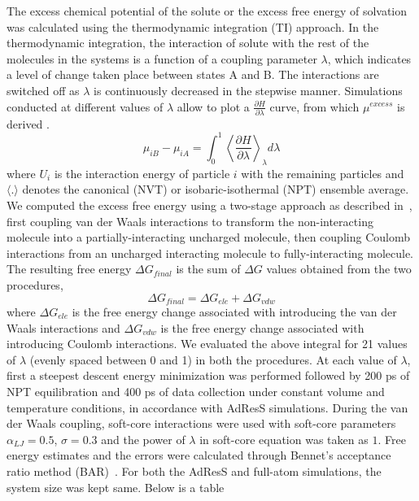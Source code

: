 \documentclass[a4paper,preprint,unsortedaddress]{revtex4-1}
\begin{document}
The excess chemical potential of the solute or the excess free energy of solvation was calculated using the 
thermodynamic integration (TI) approach. In the thermodynamic integration, the 
interaction of solute with the rest of the molecules in the systems is a function 
of a coupling parameter $\lambda$, which indicates a level of change taken place between states
A and B. The interactions are switched off as $\lambda$ is 
continuously decreased in the stepwise manner. Simulations conducted at different values of 
$\lambda$ allow to plot a $\frac{\partial H}{\partial \lambda}$ curve, from which 
$\mu^{excess}$ is derived \cite{mu}. 
\begin{equation}
 \mu_{iB} - \mu_{iA} = \int_{0}^{1} \left \langle \frac{\partial H}{\partial \lambda} \right \rangle_{\lambda} d\lambda 
\end{equation}
where $U_{i}$ is the interaction energy of particle $i$ with the remaining particles and $\langle . \rangle$
denotes the canonical (NVT) or isobaric-isothermal (NPT) ensemble average. We computed the excess 
free energy using a two-stage approach as described in~\cite{mobley}, first coupling van der Waals interactions to transform the 
non-interacting molecule into a partially-interacting uncharged molecule, then coupling Coulomb
interactions from an uncharged interacting molecule to fully-interacting molecule. The resulting 
free energy $\Delta G_{final}$ is the sum of $\Delta G$ values obtained from the two procedures,
\begin{equation}
 \Delta G_{final} = \Delta G_{ele} + \Delta G_{vdw}
\end{equation}
where $\Delta G_{ele}$ is the free energy change associated with introducing the van der Waals interactions and 
$\Delta G_{vdw}$ is the free energy change associated with introducing Coulomb interactions. 
We evaluated the above integral for 21 values of $\lambda$ (evenly spaced between 0 and 1) in both the procedures.
At each value of $\lambda$, first a steepest descent energy minimization was performed followed 
by 200 ps of NPT equilibration and 400 ps of data collection under constant volume and temperature
conditions, in accordance with AdResS simulations. 
During the van der Waals coupling, soft-core interactions were used with soft-core parameters $\alpha_{LJ} = 0.5$, 
$\sigma = 0.3$ and the power of $\lambda$ in soft-core equation was taken as $1$. Free energy estimates and the errors
were calculated through Bennet's acceptance ratio method (BAR)~\cite{bar}. 
For both the AdResS and full-atom simulations, the system size was kept same. Below is a table 
\end{document}
